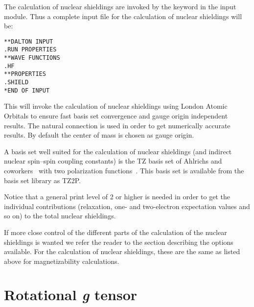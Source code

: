 The calculation of nuclear shieldings are
invoked by the 
keyword  in the  input module. Thus
a complete input file for the calculation of nuclear shieldings will
be: 

\begin{verbatim}
**DALTON INPUT
.RUN PROPERTIES
**WAVE FUNCTIONS
.HF
**PROPERTIES
.SHIELD
*END OF INPUT
\end{verbatim}

This will invoke the calculation of nuclear shieldings using
London Atomic Orbitals to ensure fast basis set
convergence and gauge 
origin independent results. The natural connection
\cite{joklbkrthpjtca90}
is used in order to get 
numerically accurate results. By default the center of mass is chosen as gauge
origin.

A basis set well suited for the calculation of nuclear shieldings (and
indirect nuclear spin--spin coupling constants) is the TZ basis set of
Ahlrichs and coworkers~\cite{ashhrajcp97,aschrajcp100} with two
polarization functions~\cite{pdkrthklbpj}. This basis set is available
from the basis set library as TZ2P. 

Notice that a general print level of 2 or higher is needed in order to
get the individual contributions (relaxation, one- and
two-electron expectation values and so on) to the total nuclear shieldings.
 
If more close control of the different parts of the calculation of the
nuclear shieldings is wanted we refer the reader to the section
describing the options available. For the calculation of nuclear
shieldings, these are the same as listed above for magnetizability
calculations.

\section{Rotational {\em g} tensor}\label{sec:gfac}

\begin{center}
\end{center}

